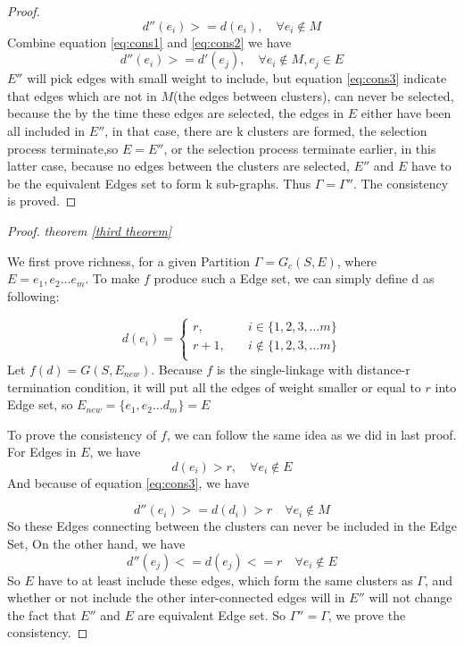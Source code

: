 \documentclass{uonmathreport}
\begin{document}
\begin{proof}
\begin{equation}
\label{eq:cons2}
 d''(e_i)  >= d(e_i), \quad \forall e_i \notin M 
\end{equation}
Combine equation \ref{eq:cons1} and \ref{eq:cons2} we have 
\begin{equation}
\label{eq:cons3}
d''(e_i)>=d'(e_j),\quad \forall e_i \notin M, e_j\in E
\end{equation}
$E''$ will pick edges with small weight to include, but equation \ref{eq:cons3} indicate that edges which are not in $M$(the edges between clusters), can never be selected, because the by the time these edges are selected, the edges in $E$ either have been all included in $E''$, in that case, there are k clusters are formed, the selection process terminate,so $E=E''$, or the selection process terminate earlier, in this latter case, because no edges between the clusters are selected, $E''$ and $E$ have to be the equivalent Edges set to form k sub-graphs. Thus $\Gamma = \Gamma''$. The consistency is proved.
\end{proof}

\begin{proof}
\textit{theorem \ref{third theorem}}

We first prove richness, for a given Partition $\Gamma = G_c(S,E)$, where $E={e_1,e_2\ldots e_m}$. To make $f$ produce such a Edge set, we can simply define d as following:

\[   
d(e_i) = 
     \begin{cases}
       r, &\quad i\in\{1,2,3,\ldots m\} \\
       r+1, &\quad i\notin\{1,2,3,\ldots m\} \\
     \end{cases}
\]
Let $f(d) = G(S,E_{new})$. Because $f$ is the single-linkage with distance-r termination condition, it will put all the edges of weight smaller or equal to $r$ into Edge set, so $E_{new} = \{e_1,e_2\ldots d_m\} = E$

To prove the consistency of $f$, we can follow the same idea as we did in last proof. For Edges in $E$, we have 
\begin{equation}
d(e_i)>r, \quad \forall e_i\notin E
\end{equation}
And because of equation \ref{eq:cons3}, we have 

\begin{equation}
d''(e_i)>=d(d_i)>r \quad \forall e_i\notin M
\end{equation}
So these Edges connecting between the clusters can never be included in the Edge Set, On the other hand, we have 
\begin{equation}
d''(e_j)<=d(e_j)<=r \quad \forall e_i\notin E
\end{equation}
So $E$ have to at least include these edges, which form the same clusters as $\Gamma$, and whether or not include the other inter-connected edges will in $E''$ will not change the fact that $E''$ and $E$ are equivalent Edge set. So $\Gamma''=\Gamma$, we prove the consistency.
 
\end{proof}
\end{document}
